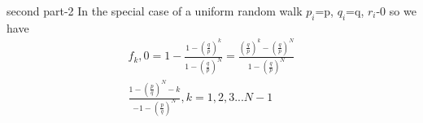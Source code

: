 \documentclass{beamer}
\begin{document}
\begin{frame}{second part-2}
  In  the special case of a uniform random walk $p_i$=p, $q_i$=q, $r_i$-0 so we have 
   \begin{align}
   &f_k,0 = 1 - \frac{1-(\frac{q}{p})^k}{1-(\frac{q}{p})^N} = \frac{(\frac{q}{p})^k - (\frac{q}{p})^N}{1 - (\frac{q}{p})^N}& \\
   & \frac{1-(\frac{p}{q})^N-k}{ - 1-(\frac{p}{q})^N}, k=1,2,3...N-1&
\end{align}

\end{frame}
\end{document}
